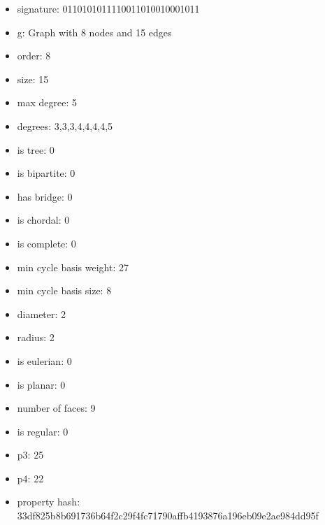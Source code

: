 \begin{itemize}
\item signature: 0110101011110011010010001011
\item g: Graph with 8 nodes and 15 edges
\item order: 8
\item size: 15
\item max degree: 5
\item degrees: 3,3,3,4,4,4,4,5
\item is tree: 0
\item is bipartite: 0
\item has bridge: 0
\item is chordal: 0
\item is complete: 0
\item min cycle basis weight: 27
\item min cycle basis size: 8
\item diameter: 2
\item radius: 2
\item is eulerian: 0
\item is planar: 0
\item number of faces: 9
\item is regular: 0
\item p3: 25
\item p4: 22
\item property hash: 33df825b8b691736b64f2c29f4fc71790affb4193876a196eb09e2ae984dd95f
\end{itemize}
\newpage
\begin{figure}
\end{figure}
